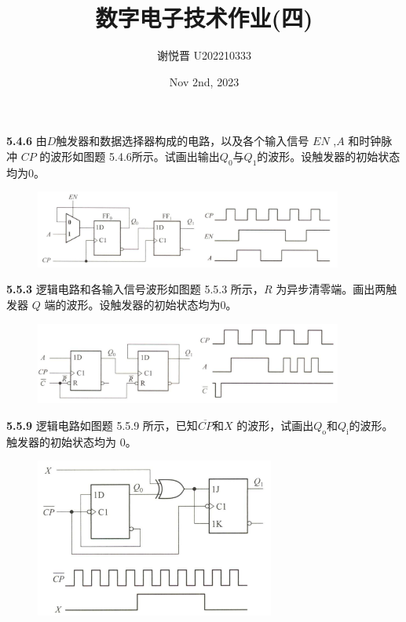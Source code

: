 \documentclass[a4paper,11pt,UTF8]{article}
\title{数字电子技术作业(四)}
\author{谢悦晋 \quad U202210333}
\date{Nov 2nd, 2023 }
\begin{document}
\maketitle
\textbf{5.4.6} 由$D$触发器和数据选择器构成的电路，以及各个输入信号 $EN$ ,$A$ 和时钟脉冲 $CP$ 的波形如图题 5.4.6所示。试画出输出$Q_0$与$Q_1$的波形。设触发器的初始状态均为0。
\begin{figure}[H]
	\centering
	\includegraphics[width=0.9\textwidth]{5.4.6}
\end{figure}
\textbf{5.5.3} 逻辑电路和各输入信号波形如图题 5.5.3 所示，$R$ 为异步清零端。画出两触发器 $Q$ 端的波形。设触发器的初始状态均为0。
\begin{figure}[H]
	\centering
	\includegraphics[width=0.9\textwidth]{5.5.3}
\end{figure}
\textbf{5.5.9} 逻辑电路如图题 5.5.9 所示，已知$\overline{CP}$和$X$ 的波形，试画出$Q_{\mathrm{o}}$和$Q_{\mathrm{i}}$的波形。触发器的初始状态均为 0。
\begin{figure}[H]
	\centering
	\includegraphics[width=0.7\textwidth]{5.5.9}
\end{figure}
\end{document}
